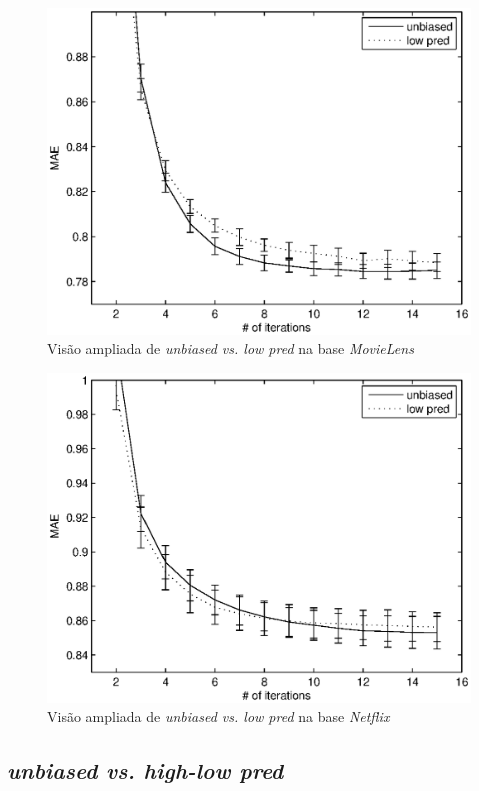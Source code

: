 \begin{figure}[ht]
\centering
\includegraphics{ml_focus_low_unbiased.eps}
\caption{Visão ampliada de \textit{unbiased vs. low pred} na base \textit{MovieLens}}
\label{fig:unbiased-lowpred-focus-movielens}
\end{figure}

\begin{figure}[ht]
\centering
\includegraphics{nf_focus_low_unbiased.eps}
\caption{Visão ampliada de \textit{unbiased vs. low pred} na base \textit{Netflix}}
\label{fig:unbiased-lowpred-focus-netflix}
\end{figure}

\subsection{\textit{unbiased vs. high-low pred}}

